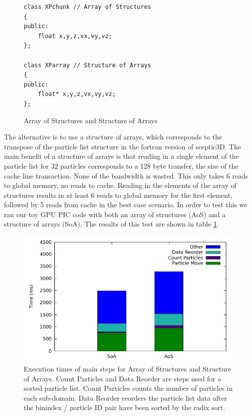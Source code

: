 \begin{figure}
\begin{lstlisting}[frame=single]
class XPchunk // Array of Structures
{
public:
	float x,y,z,vx,vy,vz;
};

class XParray // Structure of Arrays
{
public:
	float* x,y,z,vx,vy,vz;
};
\end{lstlisting}
\caption{Array of Structures and Structure of Arrays}
\end{figure}   
	
	The alternative is to use a structure of arrays, which corresponds to the transpose of the particle list structure in the fortran version of sceptic3D. The main benefit of a structure of arrays is that reading in a single element of the particle list for 32 particles corresponds to a 128 byte transfer, the size of the cache line transaction. None of the bandwidth is wasted. This only takes 6 reads to global memory, no reads to cache. Reading in the elements of the array of structures results in at least 6 reads to global memory for the first element, followed by 5 reads from cache in the best case scenario. In order to test this we ran our toy GPU PIC code with both an array of structures (AoS) and a structure of arrays (SoA). The results of this test are shown in table \ref{tab:struct_compare}. 
	
\begin{figure}[h]
\begin{center}
\includegraphics[width=5in]{design/soa_vs_aos.pdf}
\end{center}
\caption{Execution times of main steps for Array of Structures and Structure of Arrays. Count Particles and Data Reorder are steps used for a sorted particle list. Count Particles counts the number of particles in each sub-domain. Data Reorder reorders the particle list data after the binindex / particle ID pair have been sorted by the radix sort.}
\label{tab:struct_compare} 
\end{figure}



